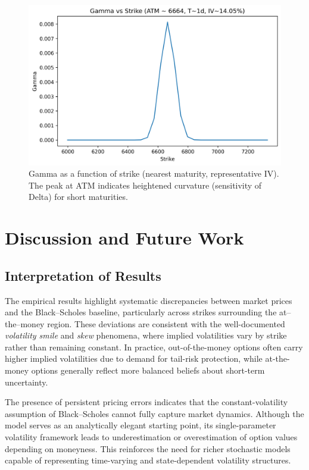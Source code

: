 \documentclass[12pt]{article}
\begin{document}
\begin{figure}[H]
\centering
\includegraphics[width=0.85\linewidth]{gamma_vs_strike.png}
\caption{Gamma as a function of strike (nearest maturity, representative IV). The peak at ATM indicates heightened
curvature (sensitivity of Delta) for short maturities.}
\label{fig:gamma}
\end{figure}

\FloatBarrier %


\section{Discussion and Future Work}

\subsection{Interpretation of Results}
The empirical results highlight systematic discrepancies between market prices and the Black--Scholes baseline, particularly across strikes surrounding the at--the--money region. These deviations are consistent with the well-documented \emph{volatility smile} and \emph{skew} phenomena, where implied volatilities vary by strike rather than remaining constant. In practice, out-of-the-money options often carry higher implied volatilities due to demand for tail-risk protection, while at-the-money options generally reflect more balanced beliefs about short-term uncertainty.

The presence of persistent pricing errors indicates that the constant-volatility assumption of Black--Scholes cannot fully capture market dynamics. Although the model serves as an analytically elegant starting point, its single-parameter volatility framework leads to underestimation or overestimation of option values depending on moneyness. This reinforces the need for richer stochastic models capable of representing time-varying and state-dependent volatility structures.
\end{document}
